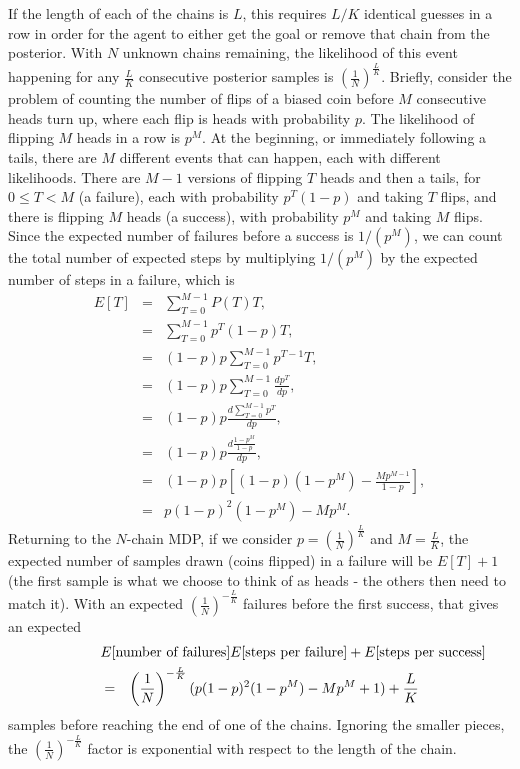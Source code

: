 If the length of each of the chains is $L$, this requires $L/K$ identical guesses in a row in order for the agent to either get the goal or remove that chain from the posterior. With $N$ unknown chains remaining, the likelihood of this event happening for any $\frac L K$ consecutive posterior samples is $(\frac 1 N)^\frac L K$. Briefly, consider the problem of counting the number of flips of a biased coin before $M$ consecutive heads turn up, where each flip is heads with probability $p$. The likelihood of flipping $M$ heads in a row is $p^M$. At the beginning, or immediately following a tails, there are $M$ different events that can happen, each with different likelihoods. There are $M-1$ versions of flipping $T$ heads and then a tails, for $0\leq T < M$ (a failure), each with probability $p^T(1-p)$ and taking $T$ flips, and there is flipping $M$ heads (a success), with probability $p^M$ and taking $M$ flips. Since the expected number of failures before a success is $1/(p^M)$, we can count the total number of expected steps by multiplying $1/(p^M)$ by the expected number of steps in a failure, which is
\begin{eqnarray}
E[T] &=& \sum_{T=0}^{M-1} P(T) T,\\
 &=& \sum_{T=0}^{M-1} p^T (1-p) T,\\
 &=&  (1-p)p \sum_{T=0}^{M-1} p^{T-1} T,\\
 &=&  (1-p)p \sum_{T=0}^{M-1} \frac {d p^T} {d p},\\
 &=&  (1-p)p \frac {d \sum_{T=0}^{M-1} p^T} {d p},\\
 &=&  (1-p)p \frac {d \frac {1-p^M}{1-p}} {d p},\\
 &=&  (1-p)p \left[ (1-p)(1-p^M)-\frac{Mp^{M-1}}{1-p}\right],\\
 &=&  p(1-p)^2(1-p^M)-Mp^{M}.
\end{eqnarray}
Returning to the $N$-chain MDP, if we consider $p=(\frac 1 N)^\frac L K$ and $M=\frac L K$, the expected number of samples drawn (coins flipped) in a failure will be $E[T]+1$ (the first sample is what we choose to think of as heads - the others then need to match it). With an expected $(\frac 1 N)^{-\frac L K}$ failures before the first success, that gives an expected 
\begin{eqnarray}
\lefteqn{E[\mbox{number of failures}]E[\mbox{steps per failure}]+E[\mbox{steps per success}]}\\
 &=& \left(\frac 1 N\right)^{-\frac L K} (p(1-p)^2(1-p^M)-Mp^{M}+1) + \frac L K
\end{eqnarray} samples before reaching the end of one of the chains. Ignoring the smaller pieces, the $(\frac 1 N)^{-\frac L K}$ factor is exponential with respect to the length of the chain.

